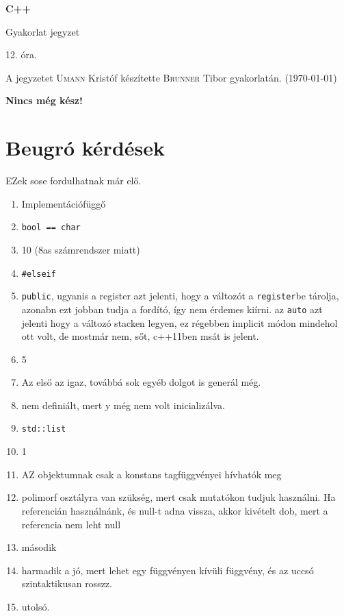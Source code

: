 \documentclass[a4paper,11.5pt,table]{article}
\begin{document}
	\setlength\parindent{0pt}
	\def\<{<\hspace{0mm}<}
	
	\theoremstyle{definition}
	\newtheorem{note}{Megjegyzés}[subsection]
	
	\begin{center}
		{\LARGE\textbf{C++}}
		
		{\Large Gyakorlat jegyzet}
		
		12. óra.
	\end{center}
	A jegyzetet \textsc{Umann} Kristóf készítette \textsc{Brunner} Tibor gyakorlatán. (\today)
	\medskip
	
	
	{\LARGE \textbf{Nincs még kész!}}
	\section{Beugró kérdések}
	EZek sose fordulhatnak már elő.
	\begin{enumerate}
		\item Implementációfüggő
		\item \texttt{bool == char}
		\item 10 (8as számrendszer miatt)
		\item \texttt{\#elseif}
		\item \texttt{public}, ugyanis a register azt jelenti, hogy a változót a \texttt{register}be tárolja, azonabn ezt jobban tudja a fordító, így nem érdemes kiírni. az \texttt{auto} azt jelenti hogy a változó stacken legyen, ez régebben implicit módon mindehol ott volt, de mostmár nem, sőt, c++11ben msát is jelent.
		\item 5
		\item Az első az igaz, továbbá sok egyéb dolgot is generál még.
		\item nem definiált, mert y még nem volt inicializálva.
		\item \texttt{std::list}
		\item 1
		\item AZ objektumnak csak a konstans tagfüggvényei hívhatók meg
		\item polimorf osztályra van szükség, mert csak mutatókon tudjuk használni. Ha referencián használnánk, és null-t adna vissza, akkor kivételt dob, mert a referencia nem leht null
		\item második
		\item harmadik a jó, mert lehet egy függvényen kívüli függvény, és az uccsó szintaktikusan rosszz.
		\item utolsó.
	\end{enumerate}
\end{document}
